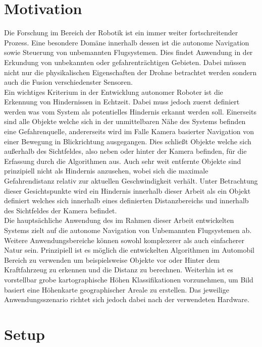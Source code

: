 \section{Motivation}
\label{sec:motivation}

Die Forschung im Bereich der Robotik ist ein immer weiter fortschreitender Prozess. Eine besondere Domäne innerhalb dessen ist die autonome Navigation sowie Steuerung von unbemannten Flugsystemen. Dies findet Anwendung in der Erkundung von unbekannten oder gefahrenträchtigen Gebieten. Dabei müssen nicht nur die physikalischen Eigenschaften der Drohne betrachtet werden sondern auch die Fusion verschiedenster Sensoren. \\

\noindent
Ein wichtiges Kriterium in der Entwicklung autonomer Roboter ist die Erkennung von Hindernissen in Echtzeit. Dabei muss jedoch zuerst definiert werden was vom System als potentielles Hindernis erkannt werden soll. Einerseits sind alle Objekte welche sich in der unmittelbaren Nähe des Systems befinden eine Gefahrenquelle, andererseits wird im Falle Kamera basierter Navigation von einer Bewegung in Blickrichtung ausgegangen. Dies schließt Objekte welche sich außerhalb des Sichtfeldes, also neben oder hinter der Kamera befinden, für die Erfassung durch die Algorithmen aus. Auch sehr weit entfernte Objekte sind prinzipiell nicht als Hindernis anzusehen, wobei sich die maximale Gefahrendistanz relativ zur aktuellen Geschwindigkeit verhält. Unter Betrachtung dieser Gesichtspunkte wird ein Hindernis innerhalb dieser Arbeit als ein Objekt definiert welches sich innerhalb eines definierten Distanzbereichs und innerhalb des Sichtfeldes der Kamera befindet. \\

\noindent
Die hauptsächliche Anwendung des im Rahmen dieser Arbeit entwickelten Systems zielt auf die autonome Navigation von Unbemannten Flugsystemen ab. Weitere Anwendungsbereiche können sowohl komplexerer als auch einfacherer Natur sein. Prinzipiell ist es möglich die entwickelten Algorithmen im Automobil Bereich zu verwenden um beispielsweise Objekte vor oder Hinter dem Kraftfahrzeug zu erkennen und die Distanz zu berechnen. Weiterhin ist es vorstellbar grobe kartographische Höhen Klassifikationen vorzunehmen, um Bild basiert eine Höhenkarte geographischer Areale zu erstellen. Das jeweilige Anwendungsszenario richtet sich jedoch dabei nach der verwendeten Hardware. 

\section{Setup}
\label{sec:setup}

